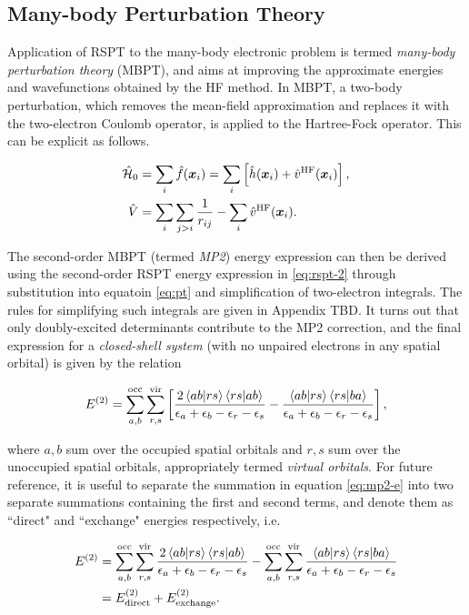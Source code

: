 \subsection{Many-body Perturbation Theory}

Application of RSPT to the many-body electronic problem is termed
\emph{many-body perturbation theory} (MBPT), and aims at improving the
approximate energies and wavefunctions obtained by the HF method. In MBPT, a
two-body perturbation, which removes the mean-field approximation and replaces
it with the two-electron Coulomb operator, is applied to the Hartree-Fock
operator. This can be explicit as follows.

\begin{align}
	\hamil_0 &=  \sum_i \hat f(\bm x_i) = \sum_i \left[ \hat h(\bm x_i) + \hat v^\text{HF}(\bm x_i) \right], \\
	\hat V &= \sum_i \sum_{j > i} \frac{1}{r_{ij}} - \sum_i \hat v^\text{HF}(\bm x_i).
\end{align}

The second-order MBPT (termed \emph{MP2}) energy expression can then be derived
using the second-order RSPT energy expression in \ref{eq:rspt-2} through
substitution into equatoin \ref{eq:pt} and simplification of two-electron
integrals. The rules for simplifying such integrals are given in Appendix TBD.
It turns out that only doubly-excited determinants contribute to the MP2
correction, and the final expression for a \emph{closed-shell system} (with no
unpaired electrons in any spatial orbital) is given by the relation

\begin{equation}
	\perturbE[]{2} =
	\sum_{a,b}^{\text{occ}} \sum_{r,s}^{\text{vir}}
	\left[
	\frac{2\braket{ab|rs}\braket{rs|ab}}{\eps_a + \eps_b - \eps_r -\eps_s}
	-
	\frac{\braket{ab|rs}\braket{rs|ba}}{\eps_a + \eps_b - \eps_r -\eps_s}
	\right],
	\label{eq:mp2-e}
\end{equation}

\noindent where $a,b$ sum over the occupied spatial orbitals and $r,s$ sum over
the unoccupied spatial orbitals, appropriately termed \emph{virtual orbitals}.
For future reference, it is useful to separate the summation in equation
\ref{eq:mp2-e} into two separate summations containing the first and second
terms, and denote them as ``direct" and ``exchange" energies respectively, i.e.

\begin{equation}
\begin{split}
	\perturbE[]{2} &=
	\sum_{a,b}^{\text{occ}} \sum_{r,s}^{\text{vir}}
	\frac{2\braket{ab|rs}\braket{rs|ab}}{\eps_a + \eps_b - \eps_r -\eps_s}
	-
	\sum_{a,b}^{\text{occ}} \sum_{r,s}^{\text{vir}}
	\frac{\braket{ab|rs}\braket{rs|ba}}{\eps_a + \eps_b - \eps_r -\eps_s}
	\\
	&= \perturbE[\text{direct}]{2} + \perturbE[\text{exchange}]{2}.
\end{split}
\end{equation}

